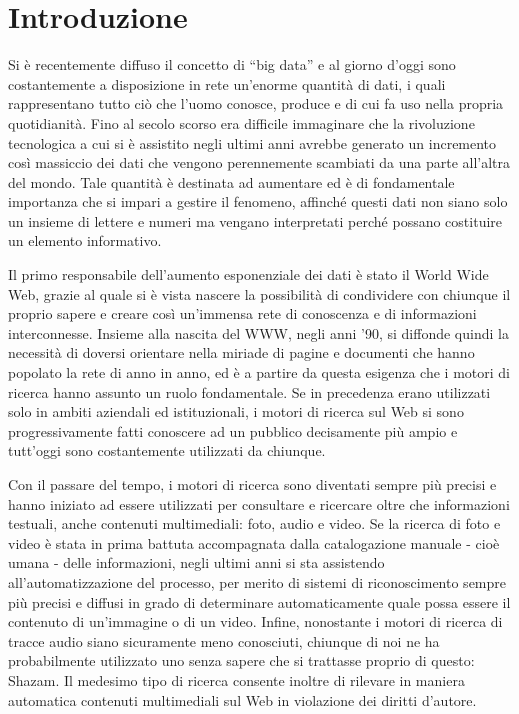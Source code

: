 
\chapter*{Introduzione}

Si è recentemente diffuso il concetto di “big data” e al giorno d'oggi sono costantemente a disposizione in rete un’enorme quantità di dati, i quali rappresentano tutto ciò che l’uomo conosce, produce e di cui fa uso nella propria quotidianità. Fino al secolo scorso era difficile immaginare che la rivoluzione tecnologica a cui si è assistito negli ultimi anni avrebbe generato un incremento così massiccio dei dati che vengono perennemente scambiati da una parte all’altra del mondo. Tale quantità è destinata ad aumentare ed è di fondamentale importanza che si impari a gestire il fenomeno, affinché questi dati non siano solo un insieme di lettere e numeri ma vengano interpretati perché possano costituire un elemento informativo.

\vspace{1em}

Il primo responsabile dell’aumento esponenziale dei dati è stato il World Wide Web, grazie al quale si è vista nascere la possibilità di condividere con chiunque il proprio sapere e creare così un’immensa rete di conoscenza e di informazioni interconnesse. Insieme alla nascita del WWW, negli anni ’90, si diffonde quindi la necessità di doversi orientare nella miriade di pagine e documenti che hanno popolato la rete di anno in anno, ed è a partire da questa esigenza che i motori di ricerca hanno assunto un ruolo fondamentale. Se in precedenza erano utilizzati solo in ambiti aziendali ed istituzionali, i motori di ricerca sul Web si sono progressivamente fatti conoscere ad un pubblico decisamente più ampio e tutt’oggi sono costantemente utilizzati da chiunque.

Con il passare del tempo, i motori di ricerca sono diventati sempre più precisi e hanno iniziato ad essere utilizzati per consultare e ricercare oltre che informazioni testuali, anche contenuti multimediali: foto, audio e video. Se la ricerca di foto e video è stata in prima battuta accompagnata dalla catalogazione manuale - cioè umana - delle informazioni, negli ultimi anni si sta assistendo all’automatizzazione del processo, per merito di sistemi di riconoscimento sempre più precisi e diffusi in grado di determinare automaticamente quale possa essere il contenuto di un’immagine o di un video. Infine, nonostante i motori di ricerca di tracce audio siano sicuramente meno conosciuti, chiunque di noi ne ha probabilmente utilizzato uno senza sapere che si trattasse proprio di questo: Shazam. Il medesimo tipo di ricerca consente inoltre di rilevare in maniera automatica contenuti multimediali sul Web in violazione dei diritti d’autore.

